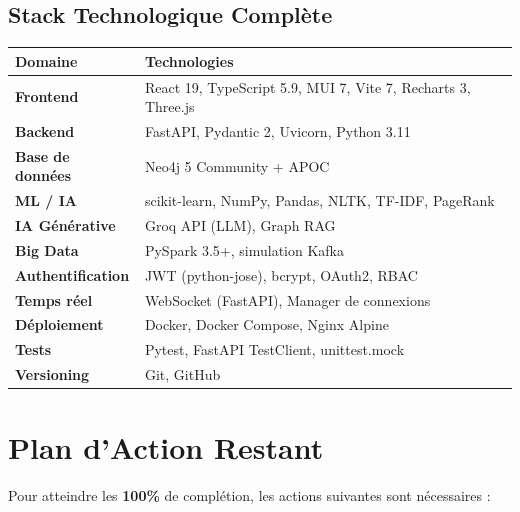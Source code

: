 \documentclass[12pt,a4paper]{article}
\begin{document}
\subsection{Stack Technologique Complète}

\begin{center}
\renewcommand{\arraystretch}{1.3}
\begin{tabular}{|l|l|}
\hline
\rowcolor{bleu!15}
\textbf{Domaine} & \textbf{Technologies} \\
\hline
\textbf{Frontend} & React 19, TypeScript 5.9, MUI 7, Vite 7, Recharts 3, Three.js \\
\hline
\textbf{Backend} & FastAPI, Pydantic 2, Uvicorn, Python 3.11 \\
\hline
\textbf{Base de données} & Neo4j 5 Community + APOC \\
\hline
\textbf{ML / IA} & scikit-learn, NumPy, Pandas, NLTK, TF-IDF, PageRank \\
\hline
\textbf{IA Générative} & Groq API (LLM), Graph RAG \\
\hline
\textbf{Big Data} & PySpark 3.5+, simulation Kafka \\
\hline
\textbf{Authentification} & JWT (python-jose), bcrypt, OAuth2, RBAC \\
\hline
\textbf{Temps réel} & WebSocket (FastAPI), Manager de connexions \\
\hline
\textbf{Déploiement} & Docker, Docker Compose, Nginx Alpine \\
\hline
\textbf{Tests} & Pytest, FastAPI TestClient, unittest.mock \\
\hline
\textbf{Versioning} & Git, GitHub \\
\hline
\end{tabular}
\end{center}

\section{Plan d'Action Restant}

Pour atteindre les \textbf{100\%} de complétion, les actions suivantes sont nécessaires :
\end{document}
